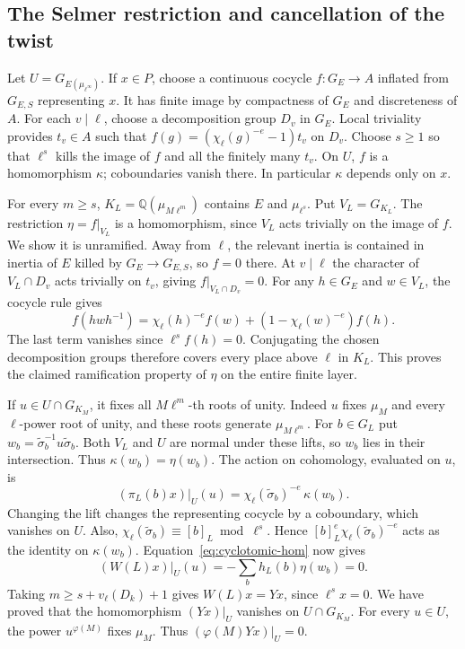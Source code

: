 \subsection{The Selmer restriction and cancellation of the twist}

Let \(U=G_{E(\mu_{\ell^\infty})}\). If \(x\in P\), choose a
continuous cocycle \(f:G_E\to A\) inflated from \(G_{E,S}\)
representing \(x\). It has finite image by compactness of \(G_E\)
and discreteness of \(A\). For each \(v\mid\ell\), choose a
decomposition group \(D_v\) in \(G_E\). Local triviality provides
\(t_v\in A\) such that
\(f(g)=(\chi_\ell(g)^{-e}-1)t_v\) on \(D_v\). Choose \(s\ge1\)
so that \(\ell^s\) kills the image of \(f\) and all the finitely
many \(t_v\). On \(U\), \(f\) is a homomorphism \(\kappa\);
coboundaries vanish there. In particular \(\kappa\) depends only
on \(x\).

For every \(m\ge s\), \(K_L=\mathbb Q(\mu_{M\ell^m})\) contains
\(E\) and \(\mu_{\ell^s}\). Put \(V_L=G_{K_L}\).
The restriction \(\eta=f|_{V_L}\) is a homomorphism, since \(V_L\)
acts trivially on the image of \(f\). We show it is unramified.
Away from \(\ell\), the relevant inertia is contained in inertia of
\(E\) killed by \(G_E\to G_{E,S}\), so \(f=0\) there. At \(v\mid\ell\)
the character of \(V_L\cap D_v\) acts trivially on \(t_v\), giving
\(f|_{V_L\cap D_v}=0\). For any \(h\in G_E\) and \(w\in V_L\), the
cocycle rule gives
\[
 f(hwh^{-1})=\chi_\ell(h)^{-e} f(w)
                    +(1-\chi_\ell(w)^{-e})f(h).
\]
The last term vanishes since \(\ell^s f(h)=0\). Conjugating the
chosen decomposition groups therefore covers every place above
\(\ell\) in \(K_L\). This proves the claimed ramification property
of \(\eta\) on the entire finite layer.

If \(u\in U\cap G_{K_M}\), it fixes all \(M\ell^m\)-th roots of
unity. Indeed \(u\) fixes \(\mu_M\) and every \(\ell\)-power root
of unity, and these roots generate \(\mu_{M\ell^m}\).
For \(b\in G_L\) put \(w_b=\widetilde\sigma_b^{-1}u\widetilde\sigma_b\).
Both \(V_L\) and \(U\) are normal under these lifts, so \(w_b\) lies
in their intersection. Thus \(\kappa(w_b)=\eta(w_b)\).
The action on cohomology, evaluated on \(u\), is
\[
 (\pi_L(b)x)|_U(u)=
             \chi_\ell(\widetilde\sigma_b)^{-e}\,\kappa(w_b).
\]
Changing the lift changes the representing cocycle by a coboundary,
which vanishes on \(U\). Also,
\(\chi_\ell(\widetilde\sigma_b)\equiv[b]_L\bmod\ell^s\). Hence
\([b]_L^e\chi_\ell(\widetilde\sigma_b)^{-e}\) acts as the identity on
\(\kappa(w_b)\). Equation~\eqref{eq:cyclotomic-hom} now gives
\[
 (W(L)x)|_U(u)=-\sum_b h_L(b)\eta(w_b)=0 .
\]
Taking \(m\ge s+v_\ell(D_k)+1\) gives \(W(L)x=Yx\), since
\(\ell^s x=0\). We have proved that the homomorphism \((Yx)|_U\)
vanishes on \(U\cap G_{K_M}\). For every \(u\in U\), the power
\(u^{\varphi(M)}\) fixes \(\mu_M\). Thus
\((\varphi(M)Yx)|_U=0\).

